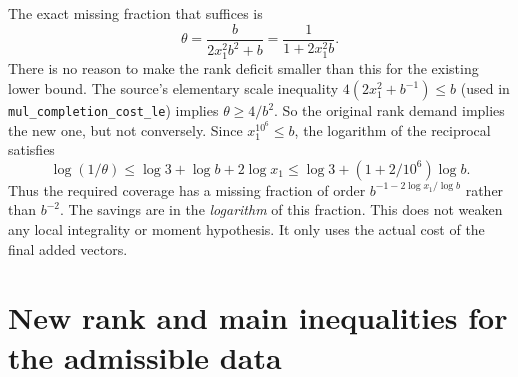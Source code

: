 \documentclass[11pt]{article}
\theoremstyle{remark}\newtheorem{remark}[theorem]{Remark}
\begin{document}
The exact missing fraction that suffices is
\begin{equation}\label{eq:theta}
\boxed{\theta=\frac{b}{2x_1^2b^2+b}=\frac1{1+2x_1^2b}.}
\end{equation}
There is no reason to make the rank deficit smaller than this for the existing lower bound. The source's elementary scale inequality $4(2x_1^2+b^{-1})\le b$ (used in \texttt{mul\_completion\_cost\_le}) implies $\theta\ge4/b^2$. So the original rank demand implies the new one, but not conversely. Since $x_1^{10^6}\le b$, the logarithm of the reciprocal satisfies
\begin{equation}\label{eq:thetaLog}
\log(1/\theta)\le\log 3+\log b+2\log x_1\le\log 3+(1+2/10^6)\log b.
\end{equation}
Thus the required coverage has a missing fraction of order $b^{-1-2\log x_1/\log b}$ rather than $b^{-2}$. The savings are in the \emph{logarithm} of this fraction. This does not weaken any local integrality or moment hypothesis. It only uses the actual cost of the final added vectors.

\section{New rank and main inequalities for the admissible data}
\end{document}
